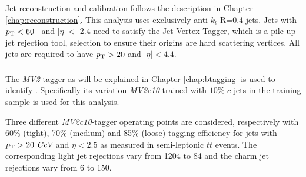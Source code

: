 %
%
%

Jet reconstruction and calibration follows the description in Chapter \ref{chap:reconstruction}.
This analysis uses exclusively anti-$k_t$ R=0.4 jets.
Jets with $p_{{\rm T}} < 60$ \GeV~and $|\eta| <$ 2.4 need to satisfy the
Jet Vertex Tagger, which is a pile-up jet rejection tool\cite{ATLAS-CONF-2014-018}, selection to ensure their origins are hard scattering vertices.
All jets are required to have $p_{{\rm T}}>20$ \GeV and $|\eta|<4.4$.


\subsubsection{\bjets}

\label{sec:vbf-btagging}
The {\it MV2}-tagger as will be explained in Chapter \ref{chap:btagging} is used to identify \bjets. Specifically its variation {\it MV2c10} trained with $10\%$ $c$-jets in the training sample is used for this analysis.


Three different {\it MV2c10}-tagger operating points are considered, respectively with 60\% (tight), 70\% (medium) and 85\% (loose) tagging efficiency for jets
with $p_{{\rm T}} > 20~\textit{GeV}{}$ and $\eta < 2.5$ as measured in semi-leptonic $t\bar{t}$ events. The corresponding light jet rejections vary from 1204 to 84 and the charm jet rejections vary from 6 to 150.

